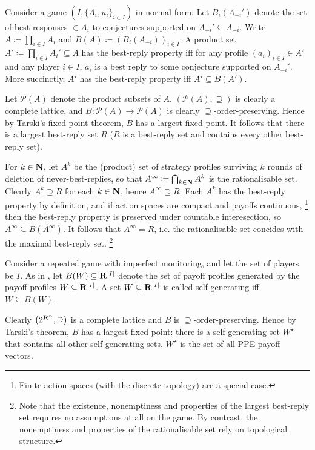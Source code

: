 \documentclass[11pt,letterpaper,reqno,oneside]{article}
\begin{document}
\begin{example}
	Consider a game $(I,\{A_i,u_i\}_{i \in I})$ in normal form. Let $B_i(A_{-i}')$ denote the set of best responses $\in A_i$ to conjectures supported on $A_{-i}' \subseteq A_{-i}$. Write $A \coloneqq \prod_{i \in I} A_i$ and $B(A) \coloneqq ( B_i(A_{-i}) )_{i \in I}$. A product set $A' \coloneqq \prod_{i \in I} A_i' \subseteq A$ has the best-reply property iff for any profile $(a_i)_{i \in I} \in A'$ and any player $i \in I$, $a_i$ is a best reply to some conjecture supported on $A_{-i}'$. More succinctly, $A'$ has the best-reply property iff $A' \subseteq B(A')$.

	Let $\mathcal{P}(A)$ denote the product subsets of $A$. $( \mathcal{P}(A), \supseteq )$ is clearly a complete lattice, and $B : \mathcal{P}(A) \to \mathcal{P}(A)$ is clearly $\supseteq$-order-preserving. Hence by Tarski's fixed-point theorem, $B$ has a largest fixed point. It follows that there is a largest best-reply set $R$ ($R$ is a best-reply set and contains every other best-reply set).

	For $k \in \N$, let $A^k$ be the (product) set of strategy profiles surviving $k$ rounds of deletion of never-best-replies, so that $A^\infty \coloneqq \Intersect_{k \in \N} A^k$ is the rationalisable set. Clearly $A^k \supseteq R$ for each $k \in \N$, hence $A^\infty \supseteq R$. Each $A^k$ has the best-reply property by definition, and if action spaces are compact and payoffs continuous,%
		\footnote{Finite action spaces (with the discrete topology) are a special case.}
	then the best-reply property is preserved under countable interesection, so $A^\infty \subseteq B(A^\infty)$. It follows that $A^\infty=R$, i.e. the rationalisable set concides with the maximal best-reply set.%
		\footnote{Note that the existence, nonemptiness and properties of the largest best-reply set requires no assumptions at all on the game. By contrast, the nonemptiness and properties of the rationalisable set rely on topological structure.}
\end{example}

\begin{example}
	Consider a repeated game with imperfect monitoring, and let the set of players be $I$. As in \textcite{AbreuPearceStacchetti1990}, let $B(W) \subseteq \R^{\abs*{I}}$ denote the set of payoff profiles generated by the payoff profiles $W \subseteq \R^{\abs*{I}}$.
	A set $W \subseteq \R^{\abs*{I}}$ is called self-generating iff $W \subseteq B(W)$.

	Clearly $\bigl( 2^{\R^n}, \supseteq \bigr)$ is a complete lattice and $B$ is $\supseteq$-order-preserving. Hence by Tarski's theorem, $B$ has a largest fixed point: there is a self-generating set $W^\star$ that contains all other self-generating sets. $W^\star$ is the set of all PPE payoff vectors.
\end{example}
\end{document}
